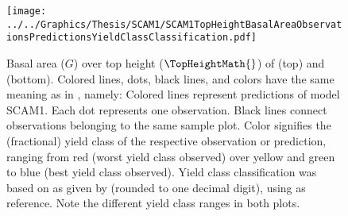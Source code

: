 \begin{figure}[h]
  \centering
  \texttt{[image: ../../Graphics/Thesis/SCAM1/SCAM1TopHeightBasalAreaObservationsPredictionsYieldClassClassification.pdf]}
  \caption{Basal area (\(G\)) over top height (\(\TopHeightMath{}\)) of \Beech{} (top) and \Spruce{} (bottom).  Colored lines, dots, black lines, and colors have the same meaning as in , namely:  Colored lines represent predictions of model SCAM1.  Each dot represents one observation.  Black lines connect observations belonging to the same sample plot.  Color signifies the (fractional) yield class of the respective observation or prediction, ranging from red (worst yield class observed) over yellow and green to blue (best yield class observed).  Yield class classification was based on \ProductivityIndexText{} as given by  (rounded to one decimal digit), using  as reference.  Note the different yield class ranges in both plots.}
  \label{fig:SCAM1TopHeightBasalAreaObservationsPredictionsYieldClassClassification}
\end{figure}

\clearpage{}

